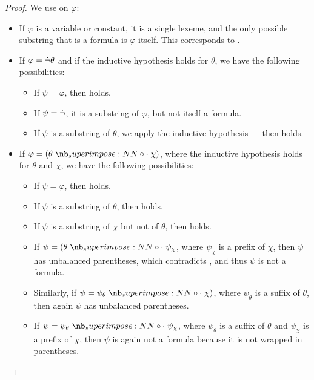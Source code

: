 \begin{proof}
  We use  on \( \varphi \):
  \begin{itemize}
    \item If \( \varphi \) is a variable or constant, it is a single lexeme, and the only possible substring that is a formula is \( \varphi \) itself. This corresponds to .
    \item If \( \varphi = \dot{\neg} \theta \) and if the inductive hypothesis holds for \( \theta \), we have the following possibilities:
    \begin{itemize}
      \item If \( \psi = \varphi \), then  holds.
      \item If \( \psi = \dot{\neg} \), it is a substring of \( \varphi \), but not itself a formula.
      \item If \( \psi \) is a substring of \( \theta \), we apply the inductive hypothesis --- then  holds.
    \end{itemize}

    \item If \( \varphi = (\theta \syncirc \chi) \), where the inductive hypothesis holds for \( \theta \) and \( \chi \), we have the following possibilities:
    \begin{itemize}
      \item If \( \psi = \varphi \), then  holds.
      \item If \( \psi \) is a substring of \( \theta \), then  holds.
      \item If \( \psi \) is a substring of \( \chi \) but not of \( \theta \), then  holds.
      \item If \( \psi = (\theta \syncirc \psi_\chi \), where \( \psi_\chi \) is a prefix of \( \chi \), then \( \psi \) has unbalanced parentheses, which contradicts , and thus \( \psi \) is not a formula.
      \item Similarly, if \( \psi = \psi_\theta \syncirc \chi) \), where \( \psi_\theta \) is a suffix of \( \theta \), then again \( \psi \) has unbalanced parentheses.
      \item If \( \psi = \psi_\theta \syncirc \psi_\chi \), where \( \psi_\theta \) is a suffix of \( \theta \) and \( \psi_\chi \) is a prefix of \( \chi \), then \( \psi \) is again not a formula because it is not wrapped in parentheses.
    \end{itemize}
  \end{itemize}
\end{proof}

